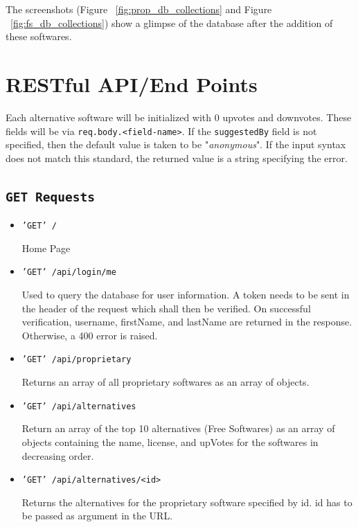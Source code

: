 The screenshots (Figure ~\ref{fig:prop_db_collections} and Figure ~\ref{fig:fs_db_collections}) show a glimpse of the database after the addition of these softwares.

\pagebreak
\section{RESTful API/End Points}

        
Each alternative software will be initialized with 0 upvotes and downvotes. These fields will be via \texttt{req.body.<field-name>}. If the \texttt{suggestedBy} field is not specified, then the default value is taken to be "\textsl{anonymous}". If the input syntax does not match this standard, the returned value is a string specifying the error.

\subsection{\texttt{GET Requests}}

\begin{itemize}

\item{\texttt{'GET' /}}

Home Page

\item{\texttt{'GET' /api/login/me}}

Used to query the database for user information. A token needs to be sent in the header of the request which shall then be verified. On successful verification, username, firstName, and lastName are returned in the response. Otherwise, a 400 error is raised.

\item{\texttt{'GET' /api/proprietary}}

Returns an array of all proprietary softwares as an array of objects.

\item{\texttt{'GET' /api/alternatives}}

Return an array of the top 10 alternatives (Free Softwares) as an array of objects containing the name, license, and upVotes for the softwares in decreasing order.

\item{\texttt{'GET' /api/alternatives/<id>}}

Returns the alternatives for the proprietary software specified by id. id has to be passed as argument in the URL.

\end{itemize}

